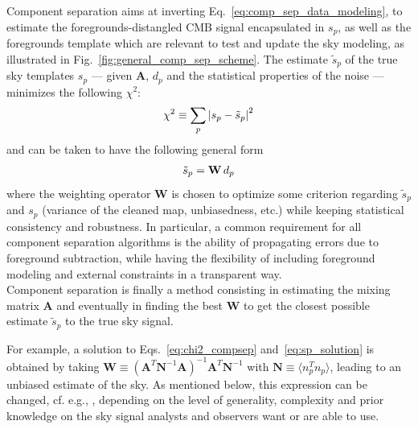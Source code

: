 Component separation aims at inverting Eq.~\ref{eq:comp_sep_data_modeling}, to estimate the foregrounds-distangled CMB signal encapsulated in $s_p$, as well as the foregrounds template which are relevant to test and update the sky modeling, as illustrated in Fig.~\ref{fig:general_comp_sep_scheme}.
The estimate $\tilde{s}_p$ of the true sky templates $s_p$ --- given $\mathbf{A}$, $d_p$ and the statistical properties of the noise --- minimizes the following $\chi^2$:
\begin{eqnarray}
	\centering
		\chi^2 \equiv \sum_p \left| s_p - \tilde{s}_p\right|^2
	\label{eq:chi2_compsep}
\end{eqnarray}
and can be taken to have the following general form
\begin{eqnarray}
	\centering
		\tilde{s}_p = \mathbf{W}\,d_p
	\label{eq:sp_solution}
\end{eqnarray}
where the weighting operator $\mathbf{W}$ is chosen to optimize some criterion regarding $\tilde{s}_p$ and $s_p$ (variance of the cleaned map, unbiasedness, etc.) while keeping statistical consistency and robustness. In particular, a common requirement for all component separation algorithms is the ability of propagating errors due to foreground subtraction, while having the flexibility of including foreground modeling and external constraints in a transparent way. \\
Component separation is finally a method consisting in estimating the mixing matrix $\mathbf{A}$ and eventually in finding the best $\mathbf{W}$ to get the closest possible estimate $\tilde{s}_p$ to the true sky signal.

For example, a solution to Eqs.~\ref{eq:chi2_compsep} and~\ref{eq:sp_solution} is obtained by taking $\mathbf{W} \equiv \left( \mathbf{A}^T\mathbf{N}^{-1}\mathbf{A} \right)^{-1}\mathbf{A}^T\mathbf{N}^{-1}$ with $\mathbf{N} \equiv \langle n_p^T n_p\rangle$, leading to an unbiased estimate of the sky. As mentioned below, this expression can be changed, cf. e.g., \cite{delabrouille09}, depending on the level of generality, complexity and prior knowledge on the sky signal analysts and observers want or are able to use. 


